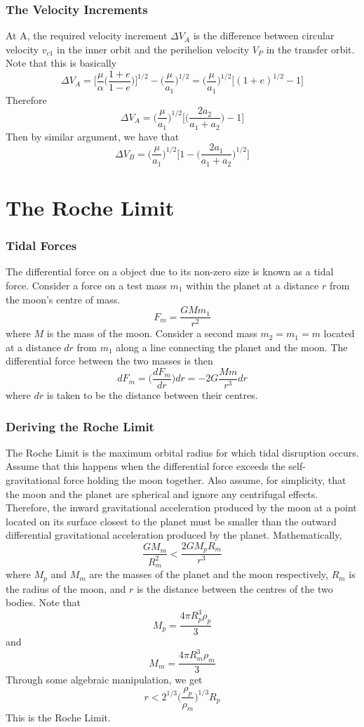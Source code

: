 \documentclass{article}
\begin{document}
\subsubsection{The Velocity Increments}
At A, the required velocity increment $\Delta V_A$ is the difference between circular velocity $v_{c1}$ in the inner orbit and the perihelion velocity $V_P$ in the transfer orbit. Note that this is basically
$$\Delta V_A=\Bigg[\frac{\mu}{\alpha}\Bigg(\frac{1+e}{1-e}\Bigg)\Bigg]^{1/2}-\Bigg(\frac{\mu}{a_1}\Bigg)^{1/2}=\Bigg(\frac{\mu}{a_1}\Bigg)^{1/2}\Big[(1+e)^{1/2}-1\Big]$$
Therefore
$$\Delta V_A=\Bigg(\frac{\mu}{a_1}\Bigg)^{1/2}\Bigg[\Bigg(\frac{2a_2}{a_1+a_2}\Bigg)-1\Bigg]$$
Then by similar argument, we have that
$$\Delta V_B=\Bigg(\frac{\mu}{a_1}\Bigg)^{1/2}\Bigg[1-\Bigg(\frac{2a_1}{a_1+a_2}\Bigg)^{1/2}\Bigg]$$
\section{The Roche Limit}
\subsubsection{Tidal Forces}
The differential force on a object due to its non-zero size is known as a tidal force. Consider a force on a test mass $m_1$ within the planet at a distance $r$ from the moon's centre of mass.
$$F_m=\frac{GMm_1}{r^2}$$
where $M$ is the mass of the moon. Consider a second mass $m_2=m_1=m$ located at a distance $dr$ from $m_1$ along a line connecting the planet and the moon. The differential force between the two masses is then
$$dF_m=\Bigg(\frac{dF_m}{dr}\Bigg)dr=-2G\frac{Mm}{r^3}dr$$
where $dr$ is taken to be the distance between their centres.
\subsubsection{Deriving the Roche Limit}
The Roche Limit is the maximum orbital radius for which tidal disruption occurs. Assume that this happens when the differential force exceeds the self-gravitational force holding the moon together. Also assume, for simplicity, that the moon and the planet are spherical and ignore any centrifugal effects. Therefore, the inward gravitational acceleration produced by the moon at a point located on its surface closest to the planet must be smaller than the outward differential gravitational acceleration produced by the planet. Mathematically, 
$$\frac{GM_m}{R_m^2}<\frac{2GM_pR_m}{r^3}$$
where $M_p$ and $M_m$ are the masses of the planet and the moon respectively, $R_m$ is the radius of the moon, and $r$ is the distance between the centres of the two bodies. Note that 
$$M_p=\frac{4\pi R_p^3\rho_p}{3}$$
and
$$M_m=\frac{4\pi R_m^3\rho_m}{3}$$
Through some algebraic manipulation, we get
$$r<2^{1/3}\Bigg(\frac{\rho_p}{\rho_m}\Bigg)^{1/3}R_p$$
This is the Roche Limit.
\newpage
\end{document}
